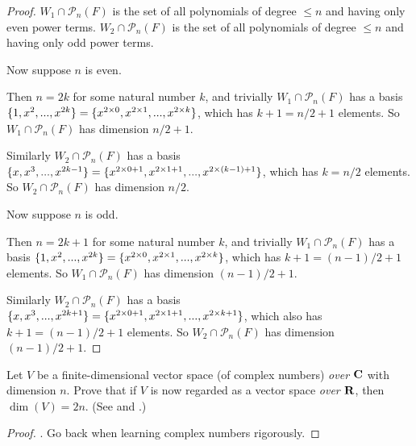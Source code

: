 \begin{proof}
\(W_1 \cap \mathcal{P}_n(F)\) is the set of all polynomials of degree \(\le n\) and having only even power terms.
\(W_2 \cap \mathcal{P}_n(F)\) is the set of all polynomials of degree \(\le n\) and having only odd power terms.

Now suppose \(n\) is even.

Then \(n = 2k\) for some natural number \(k\), and trivially \(W_1 \cap \mathcal{P}_n(F)\) has a basis \(\{ 1, x^2, ..., x^{2k} \} = \{ x^{2 \times 0}, x^{2 \times 1}, ..., x^{2 \times k} \}\), which has \(k + 1 = n/2 + 1\) elements.
So \(W_1 \cap \mathcal{P}_n(F)\) has dimension \(n/2 + 1\).

Similarly \(W_2 \cap \mathcal{P}_n(F)\) has a basis \(\{ x, x^3, ..., x^{2k - 1} \} = \{ x^{2 \times 0 + 1}, x^{2 \times 1 + 1}, ..., x^{2 \times (k - 1) + 1} \}\), which has \(k = n/2\) elements.
So \(W_2 \cap \mathcal{P}_n(F)\) has dimension \(n/2\).

Now suppose \(n\) is odd.

Then \(n = 2k + 1\) for some natural number \(k\), and trivially \(W_1 \cap \mathcal{P}_n(F)\) has a basis \(\{ 1, x^2, ..., x^{2k} \} = \{ x^{2 \times 0}, x^{2 \times 1}, ..., x^{2 \times k} \}\), which has \(k + 1 = (n - 1)/2 + 1\) elements.
So \(W_1 \cap \mathcal{P}_n(F)\) has dimension \((n - 1)/2 + 1\).

Similarly \(W_2 \cap \mathcal{P}_n(F)\) has a basis \(\{ x , x^3, ..., x^{2k + 1} \} = \{ x^{2 \times 0 + 1}, x^{2 \times 1 + 1}, ..., x^{2 \times k + 1} \}\), which also has \(k + 1 = (n - 1)/2 + 1\) elements.
So \(W_2 \cap \mathcal{P}_n(F)\) has dimension \((n - 1)/2 + 1\).
\end{proof}

\begin{exercise} \label{exercise 1.6.28}
Let \(V\) be a finite-dimensional vector space (of complex numbers) \emph{over \(\mathbf{C}\)} with dimension \(n\).
Prove that if \(V\) is now regarded as a vector space \emph{over \(\mathbf{R}\)}, then \(\dim(V) = 2n\).
(See  and .)
\end{exercise}

\begin{proof}
\TODOREF {}.
Go back when learning complex numbers rigorously.
\end{proof}

